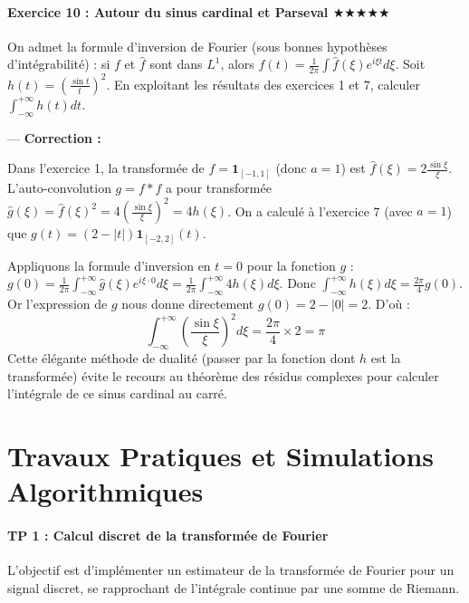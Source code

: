 \documentclass[11pt,a4paper]{article}
\begin{document}
\subsection*{Exercice 10 : Autour du sinus cardinal et Parseval \quad $\bigstar\bigstar\bigstar\bigstar\bigstar$}

On admet la formule d'inversion de Fourier (sous bonnes hypothèses d'intégrabilité) : si $f$ et $\hat{f}$ sont dans $L^1$, alors $f(t) = \frac{1}{2\pi} \int \hat{f}(\xi) e^{i\xi t} d\xi$.
Soit $h(t) = \left( \frac{\sin t}{t} \right)^2$. En exploitant les résultats des exercices 1 et 7, calculer $\int_{-\infty}^{+\infty} h(t) dt$.

---
\textbf{Correction :}

Dans l'exercice 1, la transformée de $f = \mathbf{1}_{[-1, 1]}$ (donc $a=1$) est $\hat{f}(\xi) = 2 \frac{\sin \xi}{\xi}$.
L'auto-convolution $g = f * f$ a pour transformée $\hat{g}(\xi) = \hat{f}(\xi)^2 = 4 \left( \frac{\sin \xi}{\xi} \right)^2 = 4 h(\xi)$.
On a calculé à l'exercice 7 (avec $a=1$) que $g(t) = (2 - |t|)\mathbf{1}_{[-2, 2]}(t)$.

Appliquons la formule d'inversion en $t=0$ pour la fonction $g$ :
$g(0) = \frac{1}{2\pi} \int_{-\infty}^{+\infty} \hat{g}(\xi) e^{i\xi \cdot 0} d\xi = \frac{1}{2\pi} \int_{-\infty}^{+\infty} 4 h(\xi) d\xi$.
Donc $\int_{-\infty}^{+\infty} h(\xi) d\xi = \frac{2\pi}{4} g(0)$.
Or l'expression de $g$ nous donne directement $g(0) = 2 - |0| = 2$.
D'où :
$$ \int_{-\infty}^{+\infty} \left( \frac{\sin \xi}{\xi} \right)^2 d\xi = \frac{2\pi}{4} \times 2 = \pi $$
Cette élégante méthode de dualité (passer par la fonction dont $h$ est la transformée) évite le recours au théorème des résidus complexes pour calculer l'intégrale de ce sinus cardinal au carré.




\newpage
\part{Travaux Pratiques et Simulations Algorithmiques}
\subsection*{TP 1 : Calcul discret de la transformée de Fourier}

L'objectif est d'implémenter un estimateur de la transformée de Fourier pour un signal discret, se rapprochant de l'intégrale continue par une somme de Riemann.
\end{document}
